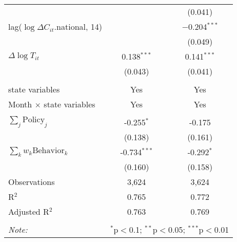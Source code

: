 \begin{tabular}{@{\extracolsep{1pt}}lcc}
  &  & (0.041) \\ 
  lag($\log \Delta C_{it}$.national, 14) &  & $-$0.204$^{***}$ \\ 
  &  & (0.049) \\ 
  $\Delta \log T_{it}$ & 0.138$^{***}$ & 0.141$^{***}$ \\ 
  & (0.043) & (0.041) \\ 
 \hline \\[-1.8ex] 
state variables & Yes & Yes \\ 
Month $\times$ state variables & Yes & Yes \\ 
\hline \\[-1.8ex] 
$\sum_j \mathrm{Policy}_j$ & -0.255$^{*}$ & -0.175 \\ 
 & (0.138) & (0.161) \\ 
$\sum_k w_k \mathrm{Behavior}_k$ & -0.734$^{***}$ & -0.292$^{*}$ \\ 
 & (0.160) & (0.158) \\ 
Observations & 3,624 & 3,624 \\ 
R$^{2}$ & 0.765 & 0.772 \\ 
Adjusted R$^{2}$ & 0.763 & 0.769 \\ 
\hline 
\hline \\[-1.8ex] 
\textit{Note:}  & \multicolumn{2}{r}{$^{*}$p$<$0.1; $^{**}$p$<$0.05; $^{***}$p$<$0.01} \\ 
\end{tabular} 